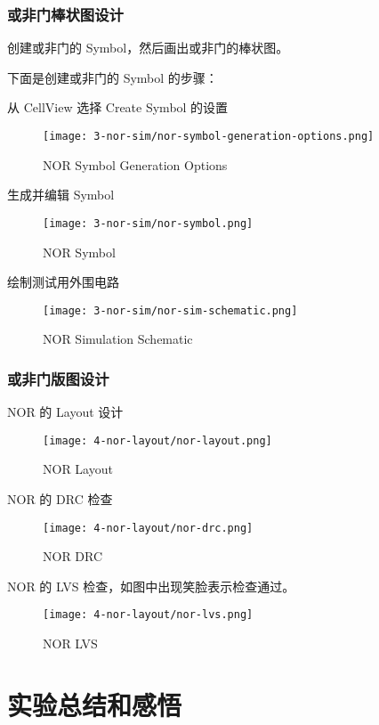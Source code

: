 \documentclass{theme-2614084}
\begin{document}
\subsubsection{或非门棒状图设计}

创建或非门的 Symbol，然后画出或非门的棒状图。

下面是创建或非门的 Symbol 的步骤：

从 CellView 选择 Create Symbol 的设置

\begin{figure}[H]
  \centering\texttt{[image: 3-nor-sim/nor-symbol-generation-options.png]}
  \caption{NOR Symbol Generation Options}
\end{figure}

生成并编辑 Symbol

\begin{figure}[H]
  \centering\texttt{[image: 3-nor-sim/nor-symbol.png]}
  \caption{NOR Symbol}
\end{figure}

绘制测试用外围电路

\begin{figure}[H]
  \centering\texttt{[image: 3-nor-sim/nor-sim-schematic.png]}
  \caption{NOR Simulation Schematic}
\end{figure}

\subsubsection{或非门版图设计}

NOR 的 Layout 设计

\begin{figure}[H]
  \centering\texttt{[image: 4-nor-layout/nor-layout.png]}
  \caption{NOR Layout}
\end{figure}

NOR 的 DRC 检查

\begin{figure}[H]
  \centering\texttt{[image: 4-nor-layout/nor-drc.png]}
  \caption{NOR DRC}
\end{figure}

NOR 的 LVS 检查，如图中出现笑脸表示检查通过。

\begin{figure}[H]
  \centering\texttt{[image: 4-nor-layout/nor-lvs.png]}
  \caption{NOR LVS}
\end{figure}

\section{实验总结和感悟}
\end{document}

